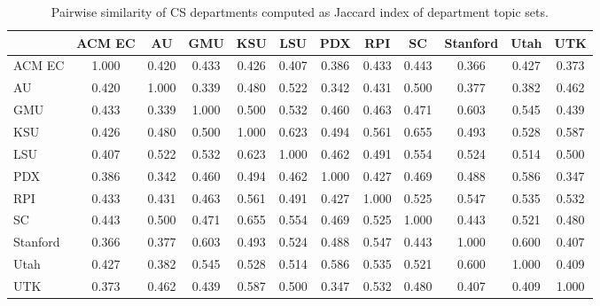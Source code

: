 
\begin{table}
  \centering
  \begin{tabular}{lccccccccccc}
    \toprule
    & ACM EC & AU & GMU & KSU & LSU & PDX & RPI & SC & Stanford & Utah & UTK \\
    \midrule
    ACM EC & 1.000 & 0.420 & 0.433 & 0.426 & 0.407 & 0.386 & 0.433 & 0.443 & 0.366 & 0.427 & 0.373 \\
    AU & 0.420 & 1.000 & 0.339 & 0.480 & 0.522 & 0.342 & 0.431 & 0.500 & 0.377 & 0.382 & 0.462 \\
    GMU & 0.433 & 0.339 & 1.000 & 0.500 & 0.532 & 0.460 & 0.463 & 0.471 & 0.603 & 0.545 & 0.439 \\
    KSU & 0.426 & 0.480 & 0.500 & 1.000 & 0.623 & 0.494 & 0.561 & 0.655 & 0.493 & 0.528 & 0.587 \\
    LSU & 0.407 & 0.522 & 0.532 & 0.623 & 1.000 & 0.462 & 0.491 & 0.554 & 0.524 & 0.514 & 0.500 \\
    PDX & 0.386 & 0.342 & 0.460 & 0.494 & 0.462 & 1.000 & 0.427 & 0.469 & 0.488 & 0.586 & 0.347 \\
    RPI & 0.433 & 0.431 & 0.463 & 0.561 & 0.491 & 0.427 & 1.000 & 0.525 & 0.547 & 0.535 & 0.532 \\
    SC & 0.443 & 0.500 & 0.471 & 0.655 & 0.554 & 0.469 & 0.525 & 1.000 & 0.443 & 0.521 & 0.480 \\
    Stanford & 0.366 & 0.377 & 0.603 & 0.493 & 0.524 & 0.488 & 0.547 & 0.443 & 1.000 & 0.600 & 0.407 \\
    Utah & 0.427 & 0.382 & 0.545 & 0.528 & 0.514 & 0.586 & 0.535 & 0.521 & 0.600 & 1.000 & 0.409 \\
    UTK & 0.373 & 0.462 & 0.439 & 0.587 & 0.500 & 0.347 & 0.532 & 0.480 & 0.407 & 0.409 & 1.000 \\
    \bottomrule
  \end{tabular}
  \caption{Pairwise similarity of CS departments computed as Jaccard index of department topic sets.\label{tbl:heatmap-key}}
\end{table}

